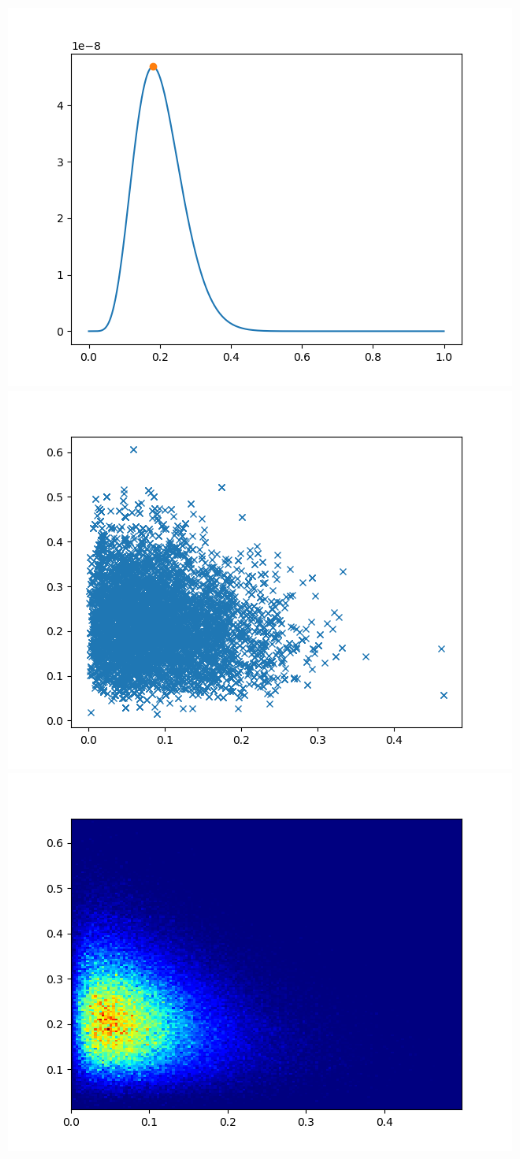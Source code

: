 \documentclass[pt12]{article}
\begin{document}
\newpage

\begin{center}
\includegraphics[scale=0.5]{hip3.png}\\
\includegraphics[scale=0.5]{sc3.png}\\
\includegraphics[scale=0.5]{den3.png}\\
\end{center}
\end{document}
